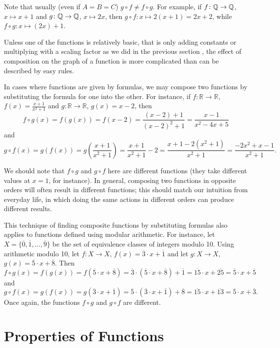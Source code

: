 Note that usually (even if $A=B=C$) $g\circ f\not=f\circ g$. For example, if
$f\colon{\mathbb Q}\to{\mathbb Q}$, $x\mapsto x+1$ and 
$g\colon{\mathbb Q}\to{\mathbb Q}$, $x\mapsto 2x$, then $g\circ f\colon x\mapsto 2(x+1)=2x+2$, while
$f\circ g\colon x\mapsto (2x)+1$.
\smallskip

Unless one of the functions is relatively basic, that is only adding
constants or multiplying with a scaling factor as we did in the previous
section , the effect of
composition on the graph of a function is more complicated than can be
described by easy rules.
\bigskip

In cases where functions are given by formulas, we may compose two functions by substituting the formula for one into the other.
For instance, if $f \colon \mathbb{R} \to \mathbb{R}$, $f(x)=\frac{x+1}{x^2+1}$ and $g \colon \mathbb{R} \to \mathbb{R}$, $g(x) = x-2$, then 
\[
f \circ g(x) = f(g(x)) = f(x-2) = \frac{(x-2)+1}{(x-2)^2+1}=\frac{x-1}{x^2-4x+5}
\]
and
\[
g \circ f(x) = g(f(x)) = g\left(\frac{x+1}{x^2+1} \right) = \frac{x+1}{x^2+1} -2 = \frac{x+1 - 2(x^2+1)}{x^2+1} = \frac{-2x^2+x-1}{x^2+1}.
\]

We should note that $f \circ g$ and $g \circ f$ here are different functions (they take different values at $x=1$, for instance).
In general, composing two functions in opposite orders will often result in different functions; this should match our intuition from everyday life, in which doing the same actions in different orders can produce different results.

This technique of finding composite functions by substituting formulas also applies to functions defined using modular arithmetic.
For instance, let $X = \{ \overline{0}, \overline{1}, \dots, \overline{9}\}$ be the set of equivalence classes of integers modulo 10.
Using arithmetic modulo 10, let $f \colon X \to X$, $f(x) = \overline{3}\cdot x + \overline{1}$ and let $g \colon X \to X$, $g(x) = \overline{5} \cdot x+\overline{8}$.
Then
\[
f \circ g(x) = f(g(x)) = f(\overline{5} \cdot x+\overline{8}) = \overline{3}\cdot (\overline{5} \cdot x+\overline{8}) + \overline{1}
= \overline{15} \cdot x + \overline{25} = \overline{5} \cdot x + \overline{5}
\]
and
\[
g \circ f(x) = g(f(x)) = g(\overline{3}\cdot x + \overline{1}) = \overline{5} \cdot (\overline{3}\cdot x + \overline{1})+\overline{8}
= \overline{15}\cdot x + \overline{13}
= \overline{5}\cdot x + \overline{3}.
\]
Once again, the functions $f \circ g$ and $g \circ f$ are different.


\section{Properties of Functions}

